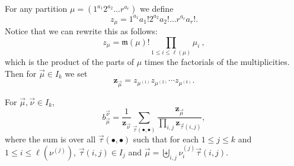 \documentclass[ALCO,Unicode]{cedram}
\begin{document}
For any partition $\mu = (1^{a_1} 2^{a_2} \ldots r^{a_r})$ we define
\[
    z_\mu = 1^{a_1} a_1! 2^{a_2} a_2! \ldots r^{a_r}a_r!.
\]
Notice that we can rewrite this as follows:
\[
    z_\mu = \mathfrak{m}(\mu)!\prod_{1\leqslant i\leqslant \ell(\mu)}\mu_i ~,
\]
which is the product of the parts of $\mu$ times the factorials of the multiplicities.
Then for $\vec{\mu} \in I_k$ we set
\[
    \mathbf{z}_{\vec{\mu}} = z_{\mu^{(1)}}z_{\mu^{(2)}}\cdots z_{\mu^{(k)}}.
\]

\begin{cor}
For $\vec{\mu}, \vec{\nu} \in I_k$,
\begin{equation}\label{eq:BinZ}
    b_{\vec{\mu}}^{\vec{\nu}} = \frac{1}{\mathbf{z}_{\vec{\nu}}} \sum_{\vec{\tau}(\bullet, \bullet)}\frac{\mathbf{z}_{\vec{\mu}}}{\prod_{i,j}\mathbf{z}_{\vec{\tau}(i,j)}},
\end{equation}
where the sum is over all $\vec{\tau}(\bullet, \bullet)$
such that for each $1\leqslant j\leqslant k$ and $1 \leqslant i \leqslant \ell(\nu^{(j)})$,
$\vec{\tau}(i,j) \in I_j$
and $\vec{\mu} = \biguplus_{i,j} \nu_i^{(j)} \vec{\tau}(i,j)$.
\end{cor}
\end{document}
